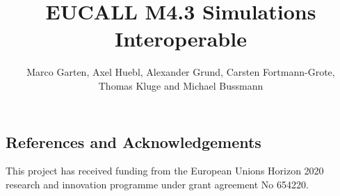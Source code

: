 \documentclass[a4paper]{article}
\title{EUCALL M4.3 Simulations Interoperable}
\author {Marco Garten, Axel Huebl, Alexander Grund, Carsten Fortmann-Grote, \\Thomas Kluge and Michael Bussmann}
\begin{document}
\maketitle

\FloatBarrier
\subsection{References and Acknowledgements}

This project has received funding from the European Unions Horizon 2020 research and innovation programme under grant agreement No 654220.



\end{document}
